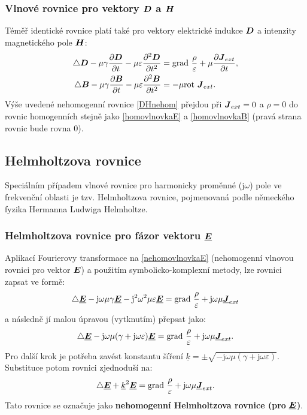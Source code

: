 \documentclass[12pt,a4paper,oneside]{article}
\numberwithin{equation}{section} %
\numberwithin{figure}{section} %
\numberwithin{table}{section} %
\newcommand{\mj}{\mathrm{j}} %
\renewcommand{\vec}[1]{\mbox{\boldmath$#1$}} %
\newcommand{\faz}[1]{{\underline{#1}}} %
\newcommand{\grad}{\mathrm{grad}\ }
\newcommand{\rot}{\mathrm{rot}\ }
\begin{document}
\subsubsection*{Vlnové rovnice pro vektory $\vec{D}$ a $\vec{H}$}
Téměř identické rovnice platí také pro vektory elektrické indukce $\vec{D}$ a intenzity magnetického pole $\vec{H}$:
\begin{subequations}
\label{DHnehom}
\begin{align}
\triangle \vec{D} - \mu \gamma \frac{\partial \vec{D}}{\partial t} - \mu \varepsilon \frac{\partial ^2 \vec{D}}{\partial t ^2} &= \grad \frac{\rho}{\varepsilon} + \mu \frac{\partial \vec{J} _{ext}}{\partial t} ,
\\
\triangle \vec{B} - \mu \gamma \frac{\partial \vec{B}}{\partial t} - \mu \varepsilon \frac{\partial ^2 \vec{B}}{\partial t ^2} &= - \mu \rot \vec{J} _{ext}.
\end{align}
\end{subequations}
Výše uvedené nehomogenní rovnice \ref{DHnehom} přejdou při $\vec{J} _{ext} = 0$ a $\rho = 0$ do rovnic homogenních stejně jako \ref{homovlnovkaE} a \ref{homovlnovkaB} (pravá strana rovnic bude rovna 0).



\subsection{Helmholtzova rovnice}
Speciálním případem vlnové rovnice pro harmonicky proměnné ($\mj \omega$) pole ve frekvenční oblasti je tzv. Helmholtzova rovnice, pojmenovaná podle německého fyzika Hermanna Ludwiga Helmholtze.

\subsubsection*{Helmholtzova rovnice pro fázor vektoru $\faz{\vec{E}}$}
Aplikací Fourierovy transformace na \ref{nehomovlnovkaE} (nehomogenní vlnovou rovnici pro vektor $\vec{E}$) a použitím symbolicko-komplexní metody, lze rovnici zapsat ve formě:
\begin{equation}
\triangle \faz{\vec{E}} - \mj \omega \mu \gamma \faz{\vec{E}} - \mj ^2 \omega ^2 \mu \varepsilon \faz{\vec{E}} = \grad \frac{\rho}{\varepsilon} + \mj \omega \mu \faz{\vec{J}} _{ext}
\end{equation}
a následně jí malou úpravou (vytknutím) přepsat jako:
\begin{equation}
\triangle \faz{\vec{E}} - \mj \omega \mu (\gamma + \mj \omega \varepsilon) \faz{\vec{E}} = \grad \frac{\rho}{\varepsilon} + \mj \omega \mu \faz{\vec{J}} _{ext} .
\end{equation}
Pro další krok je potřeba zavést konstantu šíření $\faz{k} = \pm \sqrt{- \mj \omega \mu (\gamma + \mj \omega \varepsilon)}$. Substituce potom rovnici zjednoduší na:
\begin{equation}
\triangle \faz{\vec{E}} + \faz{k} ^2 \faz{\vec{E}} = \grad \frac{\rho}{\varepsilon} + \mj \omega \mu \faz{\vec{J}} _{ext} .
\end{equation}
Tato rovnice se označuje jako \textbf{nehomogenní Helmholtzova rovnice (pro} $\faz{\vec{E}}$\textbf{)}.
\end{document}
